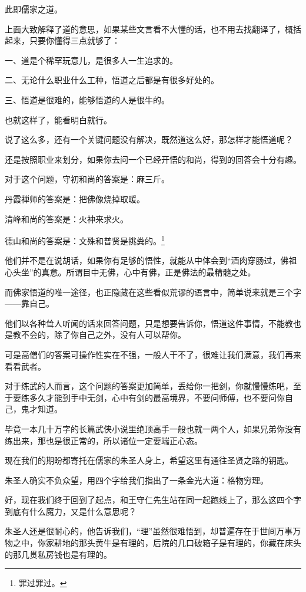 \begin{multicols}{\theparacolNo}
		此即儒家之道。

		上面大致解释了道的意思，如果某些文言看不大懂的话，也不用去找翻译了，概括起来，只要你懂得三点就够了：

		一、道是个稀罕玩意儿，是很多人一生追求的。

		二、无论什么职业什么工种，悟道之后都是有很多好处的。

		三、悟道是很难的，能够悟道的人是很牛的。

		也就这样了，能看明白就行。

		说了这么多，还有一个关键问题没有解决，既然道这么好，那怎样才能悟道呢？

		还是按照职业来划分，如果你去问一个已经开悟的和尚，得到的回答会十分有趣。

		对于这个问题，守初和尚的答案是：麻三斤。

		丹霞禅师的答案是：把佛像烧掉取暖。

		清峰和尚的答案是：火神来求火。

		德山和尚的答案是：文殊和普贤是挑粪的。\footnote{罪过罪过。}

		他们并不是在说胡话，如果你有足够的悟性，就能从中体会到“酒肉穿肠过，佛祖心头坐”的真意。所谓目中无佛，心中有佛，正是佛法的最精髓之处。

		而佛家悟道的唯一途径，也正隐藏在这些看似荒谬的语言中，简单说来就是三个字——靠自己。

		他们以各种耸人听闻的话来回答问题，只是想要告诉你，悟道这件事情，不能教也是教不会的，除了你自己之外，没有人可以帮你。

		可是高僧们的答案可操作性实在不强，一般人干不了，很难让我们满意，我们再来看看武者。

		对于练武的人而言，这个问题的答案更加简单，丢给你一把剑，你就慢慢练吧，至于要练多久才能到手中无剑，心中有剑的最高境界，不要问师傅，也不要问你自己，鬼才知道。

		毕竟一本几十万字的长篇武侠小说里绝顶高手一般也就一两个人，如果兄弟你没有练出来，那也是很正常的，所以诸位一定要端正心态。

		现在我们的期盼都寄托在儒家的朱圣人身上，希望这里有通往圣贤之路的钥匙。

		朱圣人确实不负众望，用四个字给我们指出了一条金光大道：格物穷理。

		好，现在我们终于回到了起点，和王守仁先生站在同一起跑线上了，那么这四个字到底有什么魔力，又是什么意思呢？

		朱圣人还是很耐心的，他告诉我们，“理”虽然很难悟到，却普遍存在于世间万事万物之中，你家耕地的那头黄牛是有理的，后院的几口破箱子是有理的，你藏在床头的那几贯私房钱也是有理的。


\end{multicols}
